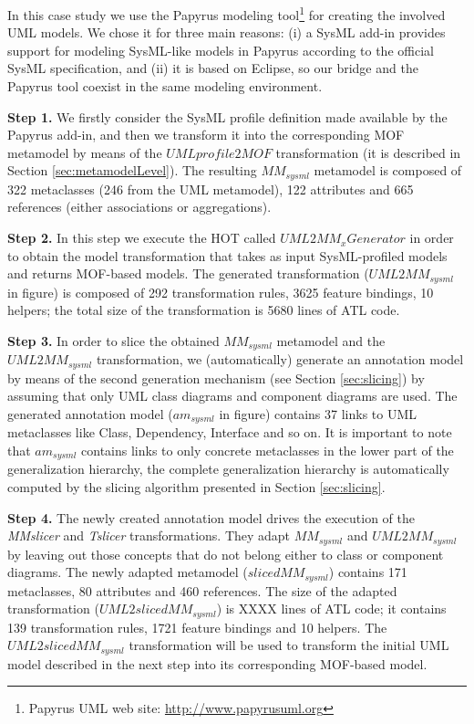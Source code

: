 In this case study we use the Papyrus modeling tool\footnote{Papyrus UML web site: \small{\url{http://www.papyrusuml.org}}} for
creating the involved UML models. We chose it for three main reasons: 
(i) a SysML add-in provides support for modeling SysML-like models in Papyrus according to the official SysML specification, and 
(ii) it is based on Eclipse, so our bridge and the Papyrus tool coexist in the same modeling environment.

\textbf{Step 1.} We firstly consider the SysML profile definition made available by the Papyrus add-in,
and then we transform it into the corresponding MOF metamodel
by means of the $UMLprofile2MOF$ transformation (it is described in Section \ref{sec:metamodelLevel}). 
The resulting $MM_{sysml}$ metamodel is composed of 322 metaclasses (246 from the UML metamodel), 
122 attributes and 665 references (either associations or aggregations).

\textbf{Step 2.} In this step we execute the HOT called $UML2MM_xGenerator$ in order to obtain the
model transformation that takes as input SysML-profiled models and returns MOF-based models. The generated transformation 
($UML2MM_{sysml}$ in figure) is composed of 292 transformation rules, 3625 feature bindings, 10 helpers; the total size of the transformation is 5680 lines of ATL code.

\textbf{Step 3.} In order to slice the obtained $MM_{sysml}$ metamodel and the $UML2MM_{sysml}$ transformation, 
we (automatically) generate an annotation model by means of the second generation mechanism
(see Section \ref{sec:slicing}) by assuming that only UML class diagrams and component diagrams are used.
The generated annotation model ($am_{sysml}$ in figure) contains 37 links to UML metaclasses like Class, Dependency, Interface and so on.
It is important to note that $am_{sysml}$ contains links to only concrete metaclasses in the lower part of the generalization hierarchy, the complete generalization hierarchy is automatically computed by the slicing algorithm presented in Section \ref{sec:slicing}.

\textbf{Step 4.} The newly created annotation model drives the execution of the \textit{MMslicer} and \textit{Tslicer} transformations.
They adapt $MM_{sysml}$ and $UML2MM_{sysml}$ by leaving out those concepts that do not
belong either to class or component diagrams. 
The newly adapted metamodel ($slicedMM_{sysml}$) contains 171 metaclasses, 80 attributes and 460 references. 
The size of the adapted transformation ($UML2slicedMM_{sysml}$) is XXXX lines 
of ATL code; it contains 139 transformation rules, 1721 feature bindings and 10 helpers. 
The $UML2slicedMM_{sysml}$ transformation will be used to transform the initial UML model described in the next step into its 
corresponding MOF-based model.

